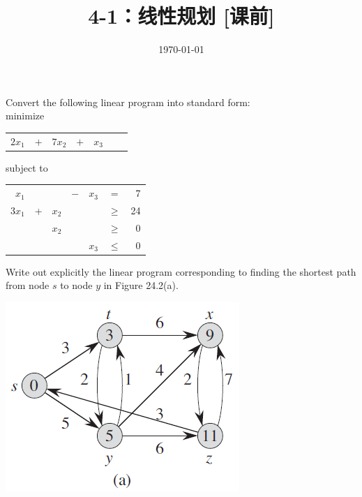 \documentclass[11pt, a4paper, UTF8]{ctexart}
\title{4-1：线性规划 [课前]}
\date{\today}
\begin{document}
\maketitle
\noplagiarism

\beginthishw
\begin{problem}[TC 29.1-4]
Convert the following linear program into standard form:\\
minimize
\begin{center}
\begin{tabular}{r r r r r r r}
$2x_1$& $+$ & $7x_2$ & $+$ & $x_3$ & & 
\end{tabular}
\end{center}
subject to
\begin{center}
\begin{tabular}{r r r r r r r}
$x_1$ & & & $-$ & $x_3$ & $=$ & 7\\
$3x_1$ & + & $x_2$ & & & $\geqslant$ & 24\\
 & & $x_2$ & & & $\geqslant$ & 0 \\
 & & & & $x_3$ & $\leqslant$ & 0 \\
\end{tabular}
\end{center}
\end{problem}
\begin{solution}
    
\end{solution}




\begin{problem}[TC 29.2-2]
Write out explicitly the linear program corresponding to finding the shortest path from node $s$ to node $y$ in Figure 24.2(a).
\begin{center}
    \includegraphics[scale=0.5]{24-2-a.png}
\end{center}
\end{problem}
\begin{solution}
    
\end{solution}
\end{document}
